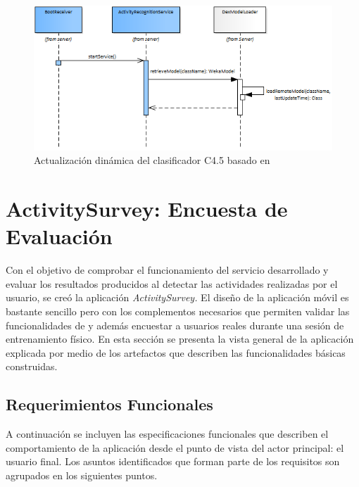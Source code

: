 \begin{figure}[H]
\begin{centering}
\includegraphics[width=1\columnwidth]{capitulo-5/graphics/service_classi}
\par\end{centering}
\caption[Actualización del clasificador C4.5]{\label{fig5:service-classi}Actualización dinámica del clasificador
C4.5 basado en }
\end{figure}


\section{ActivitySurvey: Encuesta de Evaluación}

\label{sec55:activity}Con el objetivo de comprobar el funcionamiento
del servicio \emph{} desarrollado y evaluar los resultados
producidos al detectar las actividades realizadas por el usuario,
se creó la aplicación \emph{ActivitySurvey. }El diseño de la aplicación
móvil es bastante sencillo pero con los complementos necesarios que
permiten validar las funcionalidades de \emph{} y
además encuestar a usuarios reales durante una sesión de entrenamiento
físico. En esta sección se presenta la vista general de la aplicación
explicada por medio de los artefactos que describen las funcionalidades
básicas construidas. 

\subsection{Requerimientos Funcionales}

A continuación se incluyen las especificaciones funcionales que describen
el comportamiento de la aplicación desde el punto de vista del actor
principal: el usuario final. Los asuntos identificados que forman
parte de los requisitos son agrupados en los siguientes puntos.

